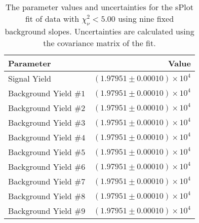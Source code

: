 
\begin{table}[ht]
    \begin{center}
        \begin{tabular}{lr}\toprule
            Parameter & Value \\\midrule
            Signal Yield & $(1.97951 \pm 0.00010) \times 10^{4}$ \\
            Background Yield $\#1$ & $(1.97951 \pm 0.00010) \times 10^{4}$ \\
            Background Yield $\#2$ & $(1.97951 \pm 0.00010) \times 10^{4}$ \\
            Background Yield $\#3$ & $(1.97951 \pm 0.00010) \times 10^{4}$ \\
            Background Yield $\#4$ & $(1.97951 \pm 0.00010) \times 10^{4}$ \\
            Background Yield $\#5$ & $(1.97951 \pm 0.00010) \times 10^{4}$ \\
            Background Yield $\#6$ & $(1.97951 \pm 0.00010) \times 10^{4}$ \\
            Background Yield $\#7$ & $(1.97951 \pm 0.00010) \times 10^{4}$ \\
            Background Yield $\#8$ & $(1.97951 \pm 0.00010) \times 10^{4}$ \\
            Background Yield $\#9$ & $(1.97951 \pm 0.00010) \times 10^{4}$ \\\bottomrule
        \end{tabular}
        \caption{The parameter values and uncertainties for the sPlot fit of data with $\chi^2_\nu < 5.00$ using nine fixed background slopes. Uncertainties are calculated using the covariance matrix of the fit.}\label{tab:splot-fit-results-chisqdof-5.00-fixed-9}
    \end{center}
\end{table}
